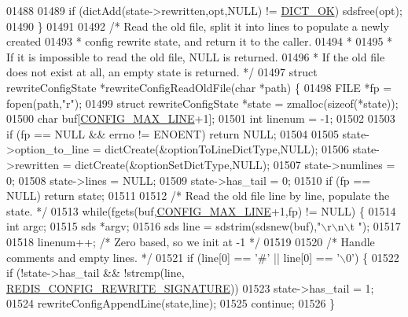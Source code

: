 \begin{DoxyCode}
{{{{{{{{{{{{{{01488 
01489     \textcolor{keywordflow}{if} (dictAdd(state->rewritten,opt,NULL) != \hyperlink{dict_8h_a2afecbeab8f7efbc183048f52f6d17e5}{DICT\_OK}) sdsfree(opt);
01490 \}
01491 
01492 \textcolor{comment}{/* Read the old file, split it into lines to populate a newly created}
01493 \textcolor{comment}{ * config rewrite state, and return it to the caller.}
01494 \textcolor{comment}{ *}
01495 \textcolor{comment}{ * If it is impossible to read the old file, NULL is returned.}
01496 \textcolor{comment}{ * If the old file does not exist at all, an empty state is returned. */}
01497 \textcolor{keyword}{struct} rewriteConfigState *rewriteConfigReadOldFile(\textcolor{keywordtype}{char} *path) \{
01498     FILE *fp = fopen(path,\textcolor{stringliteral}{"r"});
01499     \textcolor{keyword}{struct} rewriteConfigState *state = zmalloc(\textcolor{keyword}{sizeof}(*state));
01500     \textcolor{keywordtype}{char} buf[\hyperlink{server_8h_a0d8887ba7f096f153f904f206986a9fc}{CONFIG\_MAX\_LINE}+1];
01501     \textcolor{keywordtype}{int} linenum = -1;
01502 
01503     \textcolor{keywordflow}{if} (fp == NULL && errno != ENOENT) \textcolor{keywordflow}{return} NULL;
01504 
01505     state->option\_to\_line = dictCreate(&optionToLineDictType,NULL);
01506     state->rewritten = dictCreate(&optionSetDictType,NULL);
01507     state->numlines = 0;
01508     state->lines = NULL;
01509     state->has\_tail = 0;
01510     \textcolor{keywordflow}{if} (fp == NULL) \textcolor{keywordflow}{return} state;
01511 
01512     \textcolor{comment}{/* Read the old file line by line, populate the state. */}
01513     \textcolor{keywordflow}{while}(fgets(buf,\hyperlink{server_8h_a0d8887ba7f096f153f904f206986a9fc}{CONFIG\_MAX\_LINE}+1,fp) != NULL) \{
01514         \textcolor{keywordtype}{int} argc;
01515         sds *argv;
01516         sds line = sdstrim(sdsnew(buf),\textcolor{stringliteral}{"\(\backslash\)r\(\backslash\)n\(\backslash\)t "});
01517 
01518         linenum++; \textcolor{comment}{/* Zero based, so we init at -1 */}
01519 
01520         \textcolor{comment}{/* Handle comments and empty lines. */}
01521         \textcolor{keywordflow}{if} (line[0] == \textcolor{stringliteral}{'#'} || line[0] == \textcolor{stringliteral}{'\(\backslash\)0'}) \{
01522             \textcolor{keywordflow}{if} (!state->has\_tail && !strcmp(line,
      \hyperlink{config_8c_aaa12a1e51316cd3b3e52143ec8d03aeb}{REDIS\_CONFIG\_REWRITE\_SIGNATURE}))
01523                 state->has\_tail = 1;
01524             rewriteConfigAppendLine(state,line);
01525             \textcolor{keywordflow}{continue};
01526         \}
}}}}}}}}}}}}}}
\end{DoxyCode}
